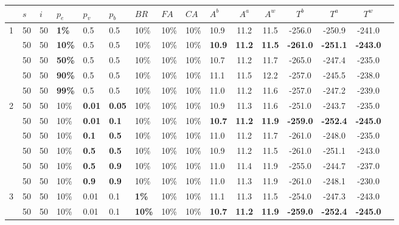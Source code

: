 \begin{sidewaystable}
    \centering
	\begin{tabular}{|l|l|l|l|l|l|l|l|l|l||c|c|c|c|c|c|}
 	\hline
    ~ & $s$ & $i$ & $p_{e}$ & $p_{v}$ & $p_{b}$ & $BR$ & $FA$ & $CA$ & $A^b$ & $A^a$ & $A^w$ & $T^b$ & $T^a$ & $T^w$\\
    \hline
    1 & 50 & 50 & \textbf{1\%} & 0.5 & 0.5 & 10\% & 10\% & 10\% & 10.9 & 11.2 & 11.5 & -256.0 & -250.9 & -241.0  \\
    ~ & 50 & 50 & \textbf{10\%} & 0.5 & 0.5 & 10\% & 10\% & 10\% & \textbf{10.9} & \textbf{11.2} & \textbf{11.5} & \textbf{-261.0} & \textbf{-251.1} & \textbf{-243.0} \\
    ~ & 50 & 50 & \textbf{50\%} & 0.5 & 0.5 & 10\% & 10\% & 10\% & 10.7 & 11.2 & 11.7 & -265.0 & -247.4 & -235.0  \\
    ~ & 50 & 50 & \textbf{90\%} & 0.5 & 0.5 & 10\% & 10\% & 10\% & 11.1 & 11.5 & 12.2 & -257.0 & -245.5 & -238.0  \\
    ~ & 50 & 50 & \textbf{99\%} & 0.5 & 0.5 & 10\% & 10\% & 10\% & 11.0 & 11.2 & 11.6 & -257.0 & -247.2 & -239.0  \\
    \hline
    2 & 50 & 50 & 10\% & \textbf{0.01} & \textbf{0.05} & 10\% & 10\% & 10\% & 10.9 & 11.3 & 11.6 & -251.0 & -243.7 & -235.0 \\
    ~ & 50 & 50 & 10\% & \textbf{0.01} & \textbf{0.1} & 10\% & 10\% & 10\% & \textbf{10.7} & \textbf{11.2} & \textbf{11.9} & \textbf{-259.0} & \textbf{-252.4} & \textbf{-245.0} \\
    ~ & 50 & 50 & 10\% & \textbf{0.1} & \textbf{0.5} & 10\% & 10\% & 10\% & 11.0 & 11.2 & 11.7 & -261.0 & -248.0 & -235.0 \\
    ~ & 50 & 50 & 10\% & \textbf{0.5} & \textbf{0.5} & 10\% & 10\% & 10\% & 10.9 & 11.2 & 11.5 & -261.0 & -251.1 & -243.0 \\
    ~ & 50 & 50 & 10\% & \textbf{0.5} & \textbf{0.9} & 10\% & 10\% & 10\% & 11.0 & 11.4 & 11.9 & -255.0 & -244.7 & -237.0 \\
    ~ & 50 & 50 & 10\% & \textbf{0.9} & \textbf{0.9} & 10\% & 10\% & 10\% & 11.0 & 11.3 & 11.9 & -261.0 & -248.1 & -230.0 \\
    \hline
    3 & 50 & 50 & 10\% & 0.01 & 0.1 & \textbf{1\%} & 10\% & 10\% & 11.1 & 11.3 & 11.5 & -254.0 & -247.3 & -243.0 \\
    ~ & 50 & 50 & 10\% & 0.01 & 0.1 & \textbf{10\%} & 10\% & 10\% & \textbf{10.7} & \textbf{11.2} & \textbf{11.9} & \textbf{-259.0} & \textbf{-252.4} & \textbf{-245.0} \\

\end{tabular}
\end{sidewaystable}

